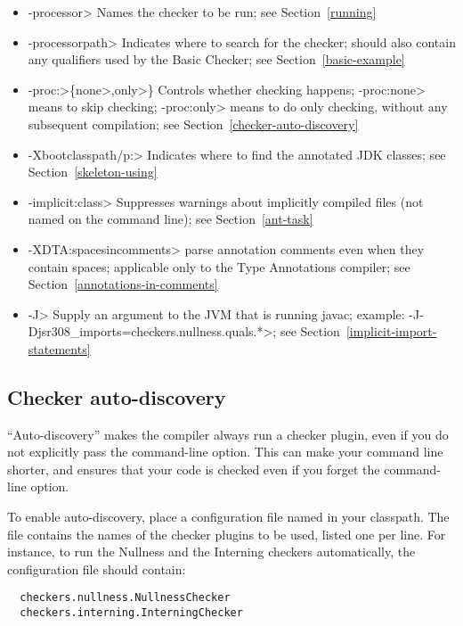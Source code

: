 \begin{itemize}
\item \<-processor> Names the checker to be
  run; see Section~\ref{running}
\item \<-processorpath> Indicates where to search for the
  checker; should also contain any qualifiers used by the Basic
  Checker; see Section~\ref{basic-example}
\item \<-proc:>\{\<none>,\<only>\} Controls whether checking
  happens; \<-proc:none>
  means to skip checking; \<-proc:only> means to do only
  checking, without any subsequent compilation; see
  Section~\ref{checker-auto-discovery}
\item \<-Xbootclasspath/p:> Indicates where to find the annotated JDK classes;
  see Section~\ref{skeleton-using}
\item \<-implicit:class> Suppresses warnings about implicitly compiled files
  (not named on the command line); see Section~\ref{ant-task}
\item \<-XDTA:spacesincomments> parse annotation comments even when they
  contain spaces; applicable only to the Type Annotations compiler; see Section~\ref{annotations-in-comments}
\item \<-J> Supply an argument to the JVM that is running javac; example:
  \<-J-Djsr308\_imports=checkers.nullness.quals.*>; see Section~\ref{implicit-import-statements}
\end{itemize}


\subsection{Checker auto-discovery\label{checker-auto-discovery}}

``Auto-discovery'' makes the  compiler always run a checker
plugin, even if you do not explicitly pass the 
command-line option.  This can make your command line shorter, and ensures
that your code is checked even if you forget the command-line option.

To enable auto-discovery, place a configuration file named
in your classpath.  The file contains the names of the checker plugins to
be used, listed one per line.  For instance, to run the Nullness and the
Interning checkers automatically, the configuration file should contain:

\begin{smaller}
\begin{Verbatim}
  checkers.nullness.NullnessChecker
  checkers.interning.InterningChecker
\end{Verbatim}
\end{smaller}

